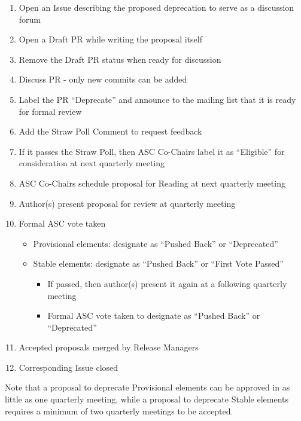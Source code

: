 \documentclass{article}
\providecommand{\tightlist}{%
  \setlength{\itemsep}{0pt}\setlength{\parskip}{0pt}}
\begin{document}
\begin{enumerate}
\def\labelenumi{\arabic{enumi}.}
\tightlist
\item
  Open an Issue describing the proposed deprecation to serve as a
  discussion forum
\item
  Open a Draft PR while writing the proposal itself
\item
  Remove the Draft PR status when ready for discussion
\item
  Discuss PR - only new commits can be added
\item
  Label the PR ``Deprecate'' and announce to the mailing list that it is
  ready for formal review
\item
  Add the Straw Poll Comment to request feedback
\item
  If it passes the Straw Poll, then ASC Co-Chairs label it as
  ``Eligible'' for consideration at next quarterly meeting
\item
  ASC Co-Chairs schedule proposal for Reading at next quarterly
  meeting
\item
  Author(s) present proposal for review at quarterly meeting
\item
  Formal ASC vote taken

  \begin{itemize}
  \tightlist
  \item
    Provisional elements: designate as ``Pushed Back'' or
    ``Deprecated''
  \item
    Stable elements: designate as ``Pushed Back'' or ``First Vote
    Passed''

    \begin{itemize}
    \tightlist
    \item
      If passed, then author(s) present it again at a following
      quarterly meeting
    \item
      Formal ASC vote taken to designate as ``Pushed Back'' or
      ``Deprecated''
    \end{itemize}
  \end{itemize}
\item
  Accepted proposals merged by Release Managers
\item
  Corresponding Issue closed
\end{enumerate}

Note that a proposal to deprecate Provisional elements can be
approved in as little as one quarterly meeting, while a proposal to
deprecate Stable elements requires a minimum of two quarterly
meetings to be accepted.
\end{document}

